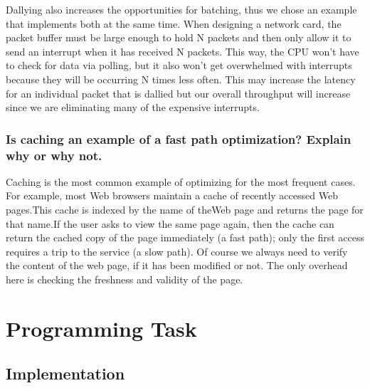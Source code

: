 \documentclass{article}      %
\begin{document}
Dallying also increases the opportunities for batching, thus we chose an example that implements both at the same time. When designing a network card, the packet buffer must be large enough to hold N packets and then only allow it to send an interrupt when it has received N packets. This way, the CPU won't have to check for data via polling, but it also won't get overwhelmed with interrupts because they will be occurring N times less often. This may increase the latency for an individual packet that is dallied but our overall throughput will increase since we are eliminating many of the expensive interrupts.\\

\subsubsection{Is caching an example of a fast path optimization? Explain why or why not.}

Caching is the most common example of optimizing for the most frequent cases. For example, most Web browsers maintain a cache of recently accessed Web pages.This cache is indexed by the name of theWeb page and returns the page for that name.If the user asks to view the same page again, then the cache can return the cached copy of the page immediately (a fast path); only the first access requires a trip to the service (a slow path). Of course we always need to verify the content of the web page, if it has been modified or not. The only overhead here is checking the freshness and validity of the page.\\

\section*{Programming Task}

\subsection*{Implementation}
\end{document}
